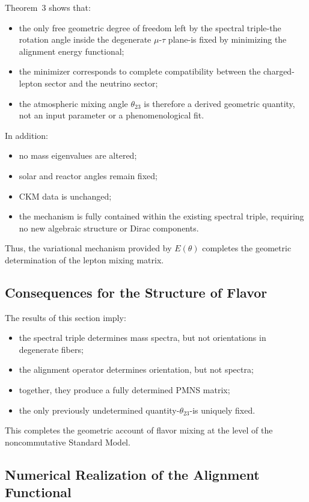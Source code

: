 Theorem~3 shows that:
\begin{itemize}
\item the only free geometric degree of freedom left by the spectral triple-the rotation angle inside the degenerate $\mu$-$\tau$ plane-is fixed by minimizing the alignment energy functional;
\item the minimizer corresponds to complete compatibility between the charged-lepton sector and the neutrino sector;
\item the atmospheric mixing angle $\theta_{23}$ is therefore a derived geometric quantity, not an input parameter or a phenomenological fit.
\end{itemize}

In addition:
\begin{itemize}
\item no mass eigenvalues are altered;
\item solar and reactor angles remain fixed;
\item CKM data is unchanged;
\item the mechanism is fully contained within the existing spectral triple, requiring no new algebraic structure or Dirac components.
\end{itemize}

Thus, the variational mechanism provided by $E(\theta)$ completes the geometric determination of the lepton mixing matrix.

\subsection{Consequences for the Structure of Flavor}

The results of this section imply:
\begin{itemize}
\item the spectral triple determines mass spectra, but not orientations in degenerate fibers;
\item the alignment operator determines orientation, but not spectra;
\item together, they produce a fully determined PMNS matrix;
\item the only previously undetermined quantity-$\theta_{23}$-is uniquely fixed.
\end{itemize}

This completes the geometric account of flavor mixing at the level of the noncommutative Standard Model.

\subsection{Numerical Realization of the Alignment Functional}

